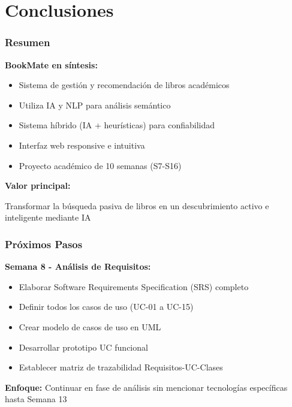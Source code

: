 \documentclass[aspectratio=169]{beamer}
\begin{document}
\section{Conclusiones}

\begin{frame}
\frametitle{Resumen}

\textbf{BookMate en síntesis:}

\begin{itemize}
\item Sistema de gestión y recomendación de libros académicos
\item Utiliza IA y NLP para análisis semántico
\item Sistema híbrido (IA + heurísticas) para confiabilidad
\item Interfaz web responsive e intuitiva
\item Proyecto académico de 10 semanas (S7-S16)
\end{itemize}

\vspace{0.5cm}

\textbf{Valor principal:}
\begin{tcolorbox}[colback=blue!5, colframe=blue!50]
Transformar la búsqueda pasiva de libros en un descubrimiento activo e inteligente mediante IA
\end{tcolorbox}

\end{frame}

\begin{frame}
\frametitle{Próximos Pasos}

\textbf{Semana 8 - Análisis de Requisitos:}

\begin{itemize}
\item Elaborar Software Requirements Specification (SRS) completo
\item Definir todos los casos de uso (UC-01 a UC-15)
\item Crear modelo de casos de uso en UML
\item Desarrollar prototipo UC funcional
\item Establecer matriz de trazabilidad Requisitos-UC-Clases
\end{itemize}

\vspace{0.5cm}

\begin{tcolorbox}[colback=yellow!5, colframe=yellow!50]
\textbf{Enfoque:} Continuar en fase de análisis sin mencionar tecnologías específicas hasta Semana 13
\end{tcolorbox}

\end{frame}
\end{document}
